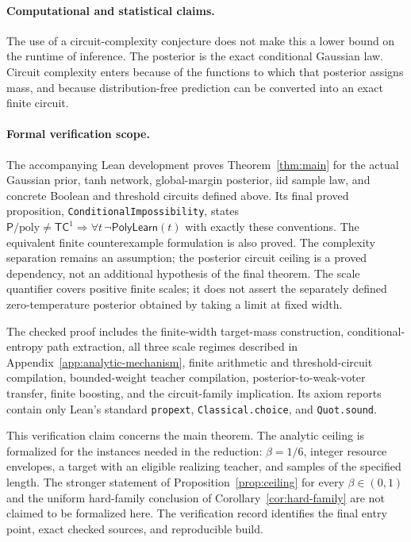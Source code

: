 \documentclass[11pt]{article}
\theoremstyle{remark}\newtheorem{remark}[theorem]{Remark}
\newcommand{\Pp}{\mathsf P/\mathrm{poly}}
\newcommand{\TC}{\mathsf{TC}}
\begin{document}
\paragraph{Computational and statistical claims.}
The use of a circuit-complexity conjecture does not make this a lower
bound on the runtime of inference. The posterior is the exact conditional
Gaussian law. Circuit complexity enters because of the functions to
which that posterior assigns mass, and because distribution-free
prediction can be converted into an exact finite circuit.

\paragraph{Formal verification scope.}
The accompanying Lean development proves Theorem~\ref{thm:main} for the
actual Gaussian prior, tanh network, global-margin posterior, iid sample
law, and concrete Boolean and threshold circuits defined above. Its final
proved proposition, \texttt{ConditionalImpossibility}, states
$\Pp\ne\TC^1\Rightarrow\forall t\,\neg\mathsf{PolyLearn}(t)$ with
exactly these conventions. The equivalent finite counterexample
formulation is also proved. The complexity separation remains an
assumption; the posterior circuit ceiling is a proved dependency, not
an additional hypothesis of the final theorem. The scale quantifier
covers positive finite scales; it does not assert the separately defined
zero-temperature posterior obtained by taking a limit at fixed width.

The checked proof includes the finite-width target-mass construction,
conditional-entropy path extraction, all three scale regimes described in Appendix~\ref{app:analytic-mechanism},
finite arithmetic and threshold-circuit compilation, bounded-weight
teacher compilation, posterior-to-weak-voter transfer, finite boosting,
and the circuit-family implication. Its axiom reports contain only
Lean's standard \texttt{propext}, \texttt{Classical.choice}, and
\texttt{Quot.sound}.

This verification claim concerns the main theorem. The analytic ceiling
is formalized for the instances needed in the reduction: $\beta=1/6$,
integer resource envelopes, a target with an eligible realizing teacher,
and samples of the specified length. The stronger statement of
Proposition~\ref{prop:ceiling} for every $\beta\in(0,1)$ and the uniform
hard-family conclusion of Corollary~\ref{cor:hard-family} are not claimed
to be formalized here. The verification record identifies the final
entry point, exact checked sources, and reproducible build.
\end{document}
